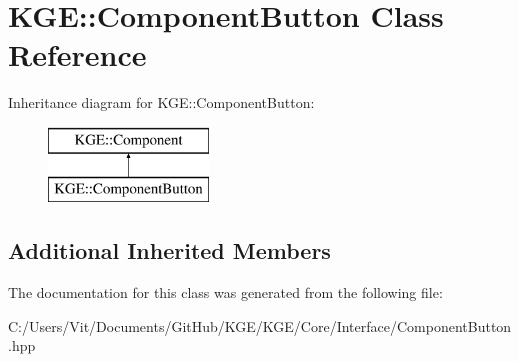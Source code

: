 \hypertarget{class_k_g_e_1_1_component_button}{\section{K\-G\-E\-:\-:Component\-Button Class Reference}
\label{class_k_g_e_1_1_component_button}
}
Inheritance diagram for K\-G\-E\-:\-:Component\-Button\-:\begin{figure}[H]
\begin{center}
\leavevmode
\includegraphics[height=2.000000cm]{class_k_g_e_1_1_component_button}
\end{center}
\end{figure}
\subsection*{Additional Inherited Members}


The documentation for this class was generated from the following file\-:\begin{DoxyCompactItemize}
\item 
C\-:/\-Users/\-Vit/\-Documents/\-Git\-Hub/\-K\-G\-E/\-K\-G\-E/\-Core/\-Interface/Component\-Button.\-hpp\end{DoxyCompactItemize}
